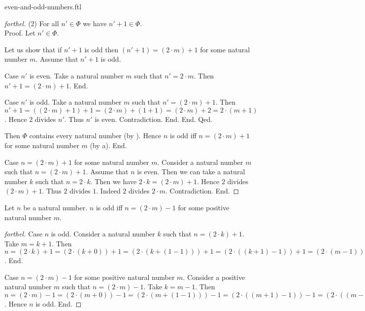 \documentclass{naproche-library}
\begin{document}
\begin{smodule}{even-and-odd-numbers.ftl}
\begin{proof}[forthel]
      (2) For all $n' \in \Phi$ we have $n' + 1 \in \Phi$. \\
      Proof.
        Let $n' \in \Phi$.

        Let us show that if $n' + 1$ is odd then $(n' + 1) = (2 \cdot m) + 1$ for some natural number $m$.
          Assume that $n' + 1$ is odd.

          Case $n'$ is even.
            Take a natural number $m$ such that $n' = 2 \cdot m$.
            Then $n' + 1 = (2 \cdot m) + 1$.
          End.

          Case $n'$ is odd.
            Take a natural number $m$ such that $n' = (2 \cdot m) + 1$.
            Then $n' + 1
              = ((2 \cdot m) + 1) + 1
              = (2 \cdot m) + (1 + 1)
              = (2 \cdot m) + 2
              = 2 \cdot (m + 1)$.
            Hence $2$ divides $n'$.
            Thus $n'$ is even.
            Contradiction.
          End.
        End.
      Qed.

      Then $\Phi$ contains every natural number (by ).
      Hence $n$ is odd iff $n = (2 \cdot m) + 1$ for some natural number $m$ (by a).
    End.

    Case $n = (2 \cdot m) + 1$ for some natural number $m$.
      Consider a natural number $m$ such that $n = (2 \cdot m) + 1$.
      Assume that $n$ is even.
      Then we can take a natural number $k$ such that $n = 2 \cdot k$.
      Then we have $2 \cdot k = (2 \cdot m) + 1$.
      Hence $2$ divides $(2 \cdot m) + 1$.
      Thus $2$ divides $1$.
      Indeed $2$ divides $2 \cdot m$.
      Contradiction.
    End.
  \end{proof}

  \begin{proposition}[forthel,id=ARITHMETIC_15_1023652154254789,printid]
    Let $n$ be a natural number.
    $n$ is odd iff $n = (2 \cdot m) - 1$ for some positive natural number $m$.
  \end{proposition}
  \begin{proof}[forthel]
    Case $n$ is odd.
      Consider a natural number $k$ such that $n = (2 \cdot k) + 1$.
      Take $m = k + 1$.
      Then $n
        = (2 \cdot k) + 1
        = (2 \cdot (k + 0)) + 1
        = (2 \cdot (k + (1 - 1))) + 1
        = (2 \cdot ((k + 1) - 1)) + 1
        = (2 \cdot (m - 1)) + 1
        = ((2 \cdot m) - (2 \cdot 1)) + 1
        = ((2 \cdot m) - 2) + 1
        = (2 \cdot m) - 1$.
    End.

    Case $n = (2 \cdot m) - 1$ for some positive natural number $m$.
      Consider a positive natural number $m$ such that $n = (2 \cdot m) - 1$.
      Take $k = m - 1$.
      Then $n
        = (2 \cdot m) - 1
        = (2 \cdot (m + 0)) - 1
        = (2 \cdot (m + (1 - 1))) - 1
        = (2 \cdot ((m + 1) - 1)) - 1
        = (2 \cdot ((m - 1) + 1)) - 1
        = (2 \cdot (k + 1)) - 1
        = ((2 \cdot k) + (2 \cdot 1)) - 1
        = ((2 \cdot k) + 2) - 1
        = (2 \cdot k) + (2 - 1)
        = (2 \cdot k) + 1$.
      Hence $n$ is odd.
    End.
  \end{proof}



\end{smodule}
\end{document}

